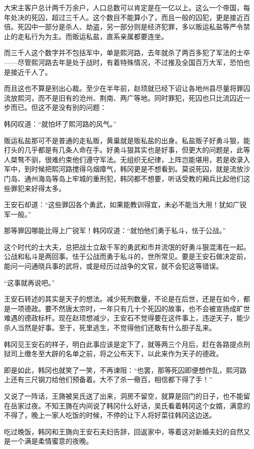 大宋主客户总计两千万余户，人口总数可以肯定是在一亿以上。这么一个帝国，每年处决的死囚，超过三千人。这个数目不能算小了，而且一般的囚犯，更是接近百倍。死囚中一部分是杀人、劫盗，另一部分则是经济犯罪，多以贩运私盐等严令禁止的走私行为为主。而贩运私盐，直系亲属都要连坐。

而三千人这个数字并不包括军中，单是熙河路，去年就杀了两百多犯了军法的士卒——尽管熙河路去年是处于战时，有着特殊情况，不过推及全国百万大军，恐怕也是接近千人了。

而且这也不算是别出心裁。至少在半年前，赵顼就已经下诏让各地州县尽量将罪囚流放熙河，而不是旧有的沧州、荆南、两广等地。同时罪犯，死囚也只比流囚近一步而已。但这不是没有别的问题：

韩冈叹道：“就怕坏了熙河路的风气。”

贩运私盐那可不是普通的走私贩，黄巢就是贩私盐的出身。私盐贩子好勇斗狠，能打头的几乎都是有几条人命在手。好勇斗狠其实也是好事，但更大的问题是，此等人桀骜不驯，很难约束他们遵守军法。无组织无纪律，上阵岂能堪用，若是收录入军中，到时候把熙河路搅得乌烟瘴气，韩冈更是不想看到。莫说死囚，就是流放沙门岛、通州海岛等岛上牢城的重刑犯，韩冈都不想要，听话受教的厢兵比起他们这些罪犯来好得太多。

王安石却道：“这些罪囚各个勇武，如果能教训得宜，未必不能当大用！犹如广锐军一般。”

那等罪囚哪能比得上广锐军！韩冈叹道：“就怕他们勇于私斗，怯于公战。”

这个时代的士大夫，总把战士立敌千军的勇武和市井流氓的好勇斗狠混淆在一起。公战和私斗是两回事。怯于公战而勇于私斗的，世所常见。要是王安石做决定前，能问一问通晓兵事的武将，或是经历过战争的文官，就不会犯这等错误。

“这事就再说吧。”

王安石转述的其实是天子的想法。减少死刑数量，不论是在后世，还是在如今，都是一项德政。要不然唐太宗时，一年只有几十个死囚的故事，也不会被宣扬成旷世难遇的德政标杆。现在赵顼想减少，王安石不觉得要在这件事上，违逆天子，能少杀人当然是好事。至于，死里逃生，不觉得他们还敢有什么胆子乱来。

韩冈见王安石的样子，明白此事应该是定下了，就等两三个月后，赶在各路提点刑狱司上缴冬至大辟的名单之前，将之公布天下，以此来作为天子的德政。

即是如此，韩冈也就笑了一笑，不再谏阻：“也罢，那等死囚即便想作乱，熙河路上还有三尺钢刀给他们预备着。大不了杀一儆百，相信都下得了手！”

又说了一阵话，王旖被吴氏送了出来，洞房不留空，就算是回门的日子，也不能留在岳家过夜。不知王旖在内间说了韩冈什么好话，吴氏看着韩冈这个女婿，满意的不得了，晚上一家人吃饭的时候，不停的让下人将好菜往韩冈这边送。

吃过晚饭，韩冈和王旖向王安石夫妇告辞，回返家中，等着这对新婚夫妇的自然又是一个满是柔情蜜意的夜晚。

